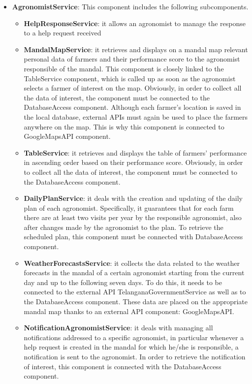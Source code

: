 \begin{itemize}
\item \textbf{AgronomistService}: This component includes the following subcomponents.

\begin{itemize}
    \item \textbf{HelpResponseService}: it allows an agronomist to manage the response to a help request received
    \item \textbf{MandalMapService}: it retrieves and displays on a mandal map relevant personal data of farmers and their performance score to the agronomist responsible of the mandal. This component is closely linked to the TableService component, which is called up as soon as the agronomist selects a farmer of interest on the map. Obviously, in order to collect all the data of interest, the component must be connected to the DatabaseAccess component. Although each farmer's location is saved in the local database, external APIs must again be used to place the farmers anywhere on the map. This is why this component is connected to GoogleMapsAPI component.
    \item \textbf{TableService}: it retrieves and displays the table of farmers’ performance in ascending order based on their performance score. Obviously, in order to collect all the data of interest, the component must be connected to the DatabaseAccess component.
    \item \textbf{DailyPlanService}: it deals with the creation and updating of the daily plan of each agronomist. Specifically, it guarantees that for each farm there are at least two visits per year by the responsible agronomist, also after changes made by the agronomist to the plan. To retrieve the scheduled plan, this component must be connected with DatabaseAccess component.
    \item \textbf{WeatherForecastsService}: it collects the data related to the weather forecasts in the mandal of a certain agronomist starting from the current day and up to the following seven days. To do this, it needs to be connected to the external API TelanganaGovernmentService as well as to the DatabaseAccess component. These data are placed on the appropriate mandal map thanks to an external API component: GoogleMapsAPI.
    \item \textbf{NotificationAgronomistService}: it deals with managing all notifications addressed to a specific agronomist, in particular whenever a help request is created in the mandal for which he/she is responsible, a notification is sent to the agronomist. In order to retrieve the notification of interest, this component is connected with the DatabaseAccess component.
\end{itemize}


\end{itemize}

